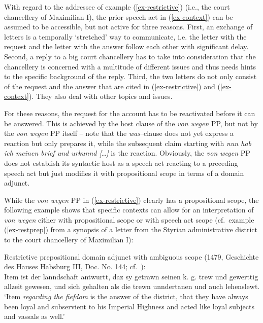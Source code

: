 \documentclass[output=paper
  ,nobabel
  ,draftmode
  ,babelshorthands
  ,colorlinks, citecolor=brown
]{langscibook}
\begin{document}
\noindent
With regard to the addressee of  example (\ref{ex-restrictive}) (i.e., the court chancellery of Maximilian I), the prior speech act in (\ref{ex-context}) can be assumed to be accessible, but not active for three reasons. First, an exchange of letters is a temporally `stretched' way to communicate, i.e. the letter with the request and the letter with the answer follow each other with significant delay. Second, a reply to a big court chancellery has to take into consideration that the chancellery is concerned with a multitude of different issues and thus needs hints to the specific background of the reply. Third, the two letters do not only consist of the request and the answer that are cited in (\ref{ex-restrictive})  and (\ref{ex-context}). They also deal with other topics and issues.

For these reasons, the request for the account has to be reactivated before it can be answered. This is achieved by the host clause of the \emph{von wegen} PP, but not by the \emph{von wegen} PP itself -- note that the \emph{was}--clause does not yet express a reaction but only prepares it, while the subsequent claim starting with \emph{nun hab ich meinen brief und urkunnd […]} is the reaction. Obviously, the \emph{von wegen} PP does not establish its syntactic host as a speech act reacting to a preceding speech act but just modifies it with propositional scope in terms of a domain adjunct.

\largerpage[-1]
While the \emph{von wegen} PP in  (\ref{ex-restrictive}) clearly has a propositional scope, the following example shows that specific contexts can allow for an interpretation of \emph{von wegen} either with propositional scope or with speech act scope (cf.\ example (\ref{ex-restprep}) from a synopsis of a letter from the Styrian administrative district to the court chancellery of Maximilian I):

\ea\label{ex-restprep}  Restrictive prepositional domain adjunct with ambiguous scope (1479, Geschichte des Hauses Habsburg III, Doc. No. 144; cf.\ \citealp[331]{Chmel1858}):\\
\smallskip
Item  ist der lanndschaft antwurtt, daz sy getrawn seinen k. g. trew und gewerttig allzeit gewesen, und sich gehalten als die trewn unndertanen und auch lehenslewt.\\
	`Item \emph{regarding the fiefdom} is the answer of the district, that they have always been loyal and subservient to his Imperial Highness and acted like loyal subjects and vassals as well.'
\z
\end{document}
